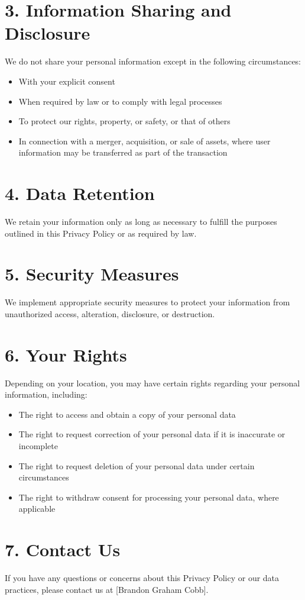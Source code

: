 \documentclass{article}
\begin{document}
\section*{3. Information Sharing and Disclosure}
We do not share your personal information except in the following circumstances:
\begin{itemize}
    \item With your explicit consent
    \item When required by law or to comply with legal processes
    \item To protect our rights, property, or safety, or that of others
    \item In connection with a merger, acquisition, or sale of assets, where user information may be transferred as part of the transaction
\end{itemize}

\section*{4. Data Retention}
We retain your information only as long as necessary to fulfill the purposes outlined in this Privacy Policy or as required by law. 

\section*{5. Security Measures}
We implement appropriate security measures to protect your information from unauthorized access, alteration, disclosure, or destruction.

\section*{6. Your Rights}
Depending on your location, you may have certain rights regarding your personal information, including:
\begin{itemize}
    \item The right to access and obtain a copy of your personal data
    \item The right to request correction of your personal data if it is inaccurate or incomplete
    \item The right to request deletion of your personal data under certain circumstances
    \item The right to withdraw consent for processing your personal data, where applicable
\end{itemize}

\section*{7. Contact Us}
If you have any questions or concerns about this Privacy Policy or our data practices, please contact us at [Brandon Graham Cobb].
\end{document}
